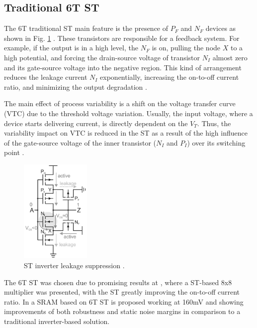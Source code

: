 \documentclass[pgmicro,mestrado,english]{iiufrgs}
\begin{document}
\subsection{Traditional 6T ST}
The 6T traditional ST main feature is the presence of ${P_F}$ and ${N_F}$ devices as shown in Fig. \ref{fig:ST} \cite{doki1984cmos}. These transistors are responsible for a feedback system. For example, if the output is in a high level, the ${N_F}$ is on, pulling the node ${X}$ to a high potential, and forcing the drain-source voltage of transistor ${N_I}$ almost zero and its gate-source voltage into the negative region. This kind of arrangement reduces the leakage current ${N_I}$ exponentially, increasing the on-to-off current ratio, and minimizing the output degradation \cite{lotze2017ultra}.

The main effect of process variability is a shift on the voltage transfer curve (VTC) due to the threshold voltage variation. Usually, the input voltage, where a device starts delivering current, is directly dependent on the $V_T$. Thus, the variability impact on VTC is reduced in the ST as a result of the high influence of the gate-source voltage of the inner transistor ($N_I$ and $P_I$) over its switching point \cite{lotze2017ultra}.

\begin{figure}[]
  \centering
    \includegraphics[width=0.3\textwidth]{ST.pdf}
     \caption{ST inverter leakage suppression \cite{lotze2017ultra}.}
  \label{fig:ST}
\end{figure}

The 6T ST was chosen due to promising results at \cite{lotze2017ultra}, where a ST-based 8x8 multiplier was presented, with the ST greatly improving the on-to-off current ratio. In \cite{kulkarni2007160} a SRAM based on 6T ST is proposed working at 160mV and showing improvements of both robustness and static noise margins in comparison to a traditional inverter-based solution.
\end{document}
